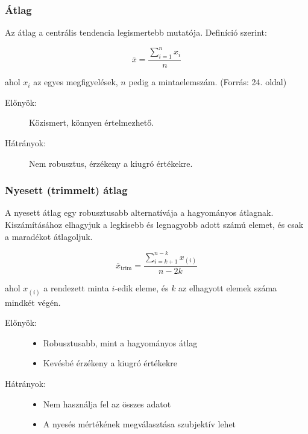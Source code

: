 \documentclass[a4paper,12pt]{article}
\begin{document}
\subsubsection{Átlag}

Az átlag a centrális tendencia legismertebb mutatója. Definíció szerint:

\begin{equation}
\bar{x} = \frac{\sum_{i=1}^n x_i}{n}
\end{equation}

ahol $x_i$ az egyes megfigyelések, $n$ pedig a mintaelemszám.
(Forrás: 24. oldal)

\begin{description}
\item[Előnyök:] Közismert, könnyen értelmezhető.
\item[Hátrányok:] Nem robusztus, érzékeny a kiugró értékekre.
\end{description}

\subsubsection{Nyesett (trimmelt) átlag}

A nyesett átlag egy robusztusabb alternatívája a hagyományos átlagnak. Kiszámításához elhagyjuk a legkisebb és legnagyobb adott számú elemet, és csak a maradékot átlagoljuk.

\begin{equation}
\bar{x}_{\text{trim}} = \frac{\sum_{i=k+1}^{n-k} x_{(i)}}{n-2k}
\end{equation}

ahol $x_{(i)}$ a rendezett minta $i$-edik eleme, és $k$ az elhagyott elemek száma mindkét végén.

\begin{description}
\item[Előnyök:]
\begin{itemize}
    \item Robusztusabb, mint a hagyományos átlag
    \item Kevésbé érzékeny a kiugró értékekre
\end{itemize}
\item[Hátrányok:]
\begin{itemize}
    \item Nem használja fel az összes adatot
    \item A nyesés mértékének megválasztása szubjektív lehet
\end{itemize}
\end{description}
\end{document}
